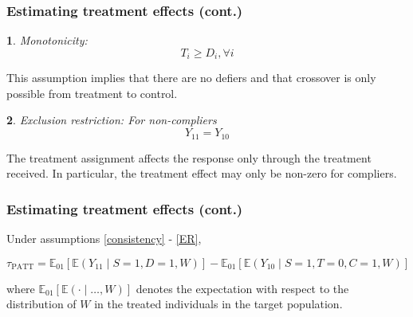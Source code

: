 \documentclass{beamer}
\makeatletter
\newtheorem*{assumption*}{\assumptionnumber}
\providecommand{\assumptionnumber}{}
\newenvironment{assumption}[2]
 {%
  \renewcommand{\assumptionnumber}{Assumption #1}%
  \begin{assumption*}%
  \protected@edef\@currentlabel{#1}%
 }
 {%
  \end{assumption*}
 }
\newcommand{\ex}{\mathbb{E}} %
\makeatother
\begin{document}
\begin{frame}
\frametitle{Estimating treatment effects (cont.)}
\begin{assumption}{6}{}\label{monotonicity}
Monotonicity: 
\begin{equation*}
T_i \geq D_i, \forall i
\end{equation*}
\end{assumption}
\noindent This assumption implies that there are no defiers and that crossover is only possible from treatment to control.
\begin{assumption}{7}{}\label{ER}
Exclusion restriction: For non-compliers
\begin{equation*}
Y_{11} = Y_{10}
\end{equation*}  
\end{assumption}
\noindent The treatment assignment affects the response only through the treatment received.  In particular, the treatment effect may only be non-zero for compliers.  
\end{frame}



\begin{frame}
\frametitle{Estimating treatment effects (cont.)}
\begin{theorem}\label{thm1}
Under assumptions \eqref{consistency} - \eqref{ER},

$$\tau_{\text{PATT}} = \ex_{01}\left[  \ex\left(Y_{11} \mid S=1, D=1, W\right)\right]
-\ex_{01}\left[  \ex\left(Y_{10} \mid S=1, T=0, C=1, W\right) \right] $$

where $\ex_{01}\left[\ex(\cdot \mid\dots, W)\right]$ denotes the expectation with respect to the distribution of $W$ in the treated individuals in the target population.  
\end{theorem}
\end{frame}
\end{document}
